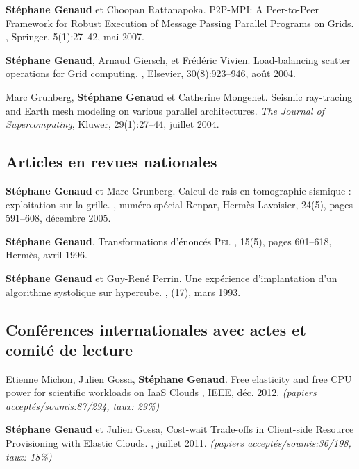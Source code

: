 \documentclass[11pt]{article}
\begin{document}
\begin{thebibliography}{99}
\textbf{Stéphane Genaud} et Choopan Rattanapoka.
\newblock P2P-MPI: A Peer-to-Peer Framework for Robust Execution of Message 
Passing Parallel Programs on Grids.
, Springer, 5(1):27--42, mai 2007.


\textbf{Stéphane Genaud}, Arnaud Giersch, et Frédéric Vivien.
\newblock Load-balancing scatter operations for Grid computing.
, Elsevier, 30(8):923--946, août 2004.

Marc Grunberg, \textbf{Stéphane Genaud} et Catherine Mongenet.
\newblock Seismic ray-tracing and Earth mesh modeling on various parallel
  architectures.
\newblock 
{\em The Journal of Supercomputing}, Kluwer, 29(1):27--44, juillet 2004.


\subsection*{Articles en revues nationales}
\textbf{Stéphane Genaud} et Marc Grunberg. 
\newblock  Calcul de rais en tomographie sismique : exploitation sur la grille.
, numéro spécial Renpar, 
Hermès-Lavoisier, 24(5), pages 591--608, décembre 2005.

\textbf{Stéphane Genaud}.
\newblock Transformations d'énoncés \textsc{Pei}.
, 15(5), pages 601--618, 
Hermès, avril 1996.

\textbf{Stéphane Genaud} et Guy-René Perrin.
\newblock Une expérience d'implantation d'un algorithme systolique sur
  hypercube.
,
  (17), mars 1993.


\subsection*{Conférences internationales avec actes et comité de lecture}

Etienne Michon, Julien Gossa, \textbf{Stéphane Genaud}.
\newblock Free elasticity and free CPU power for scientific workloads on IaaS Clouds
, 
IEEE, déc. 2012.
\newblock \small{\textit{(papiers acceptés/soumis:87/294, taux: 29\%)}}


\newblock \textbf{Stéphane Genaud} et Julien Gossa,
\newblock Cost-wait Trade-offs in Client-side Resource Provisioning with 
Elastic Clouds.
, juillet 2011.
\newblock \small{\textit{(papiers acceptés/soumis{:}36/198, taux: 18\%)}}



\end{thebibliography}
\end{document}
